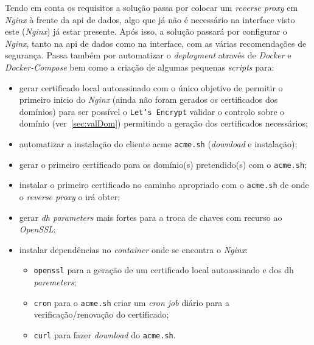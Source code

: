 Tendo em conta os requisitos a solução passa por colocar um \textit{reverse proxy} em \textit{Nginx} à frente da 
\acrshort{api} de dados, algo que já não é necessário na interface visto este (\textit{Nginx}) já estar presente. 
Após isso, a solução passará por configurar o \textit{Nginx}, tanto na \acrshort{api} de dados como na interface, 
com as várias recomendações de segurança. 
Passa também por automatizar o \textit{deployment} através de \textit{Docker} e \textit{Docker-Compose} bem como 
a criação de algumas pequenas \textit{scripts} para:
\begin{itemize}
    \item gerar certificado local autoassinado com o único objetivo de permitir o primeiro inicio do \textit{Nginx} 
    (ainda não foram gerados os certificados dos domínios) para ser possível o \texttt{Let's Encrypt} validar o 
    controlo sobre o domínio (ver~\ref{sec:valDom}) permitindo a geração dos certificados necessários;
    \item automatizar a instalação do cliente \acrshort{acme} \texttt{acme.sh} (\textit{download} e instalação);
    \item gerar o primeiro certificado para os domínio(s) pretendido(s) com o \texttt{acme.sh};
    \item instalar o primeiro certificado no caminho apropriado com o \texttt{acme.sh} de onde o 
    \textit{reverse proxy} o irá obter;
    \item gerar \textit{\acrshort{dh} parameters} mais fortes para a troca de chaves com recurso ao \textit{OpenSSL};
    \item instalar dependências no \textit{container} onde se encontra o \textit{Nginx}:
    \begin{itemize}
        \item \texttt{openssl} para a geração de um certificado local autoassinado e dos \acrshort{dh} 
        \textit{paremeters};
        \item \texttt{cron} para o \texttt{acme.sh} criar um \textit{cron job} diário para a verificação/renovação 
        do certificado;
        \item \texttt{curl} para fazer \textit{download} do \texttt{acme.sh}.
    \end{itemize}
\end{itemize}

